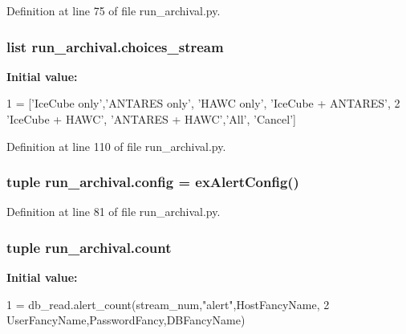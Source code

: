Definition at line 75 of file run\-\_\-archival.\-py.

\hypertarget{namespacerun__archival_a18e24cc5c90db59c1cff4c0f69f82fa6}{
\subsubsection[{choices\-\_\-stream}]{\setlength{\rightskip}{0pt plus 5cm}list run\-\_\-archival.\-choices\-\_\-stream}}\label{namespacerun__archival_a18e24cc5c90db59c1cff4c0f69f82fa6}
{\bfseries Initial value\-:}
\begin{DoxyCode}
1 = [\textcolor{stringliteral}{'IceCube only'},\textcolor{stringliteral}{'ANTARES only'}, \textcolor{stringliteral}{'HAWC only'}, \textcolor{stringliteral}{'IceCube + ANTARES'},
2                     \textcolor{stringliteral}{'IceCube + HAWC'}, \textcolor{stringliteral}{'ANTARES + HAWC'},\textcolor{stringliteral}{'All'}, \textcolor{stringliteral}{'Cancel'}]
\end{DoxyCode}


Definition at line 110 of file run\-\_\-archival.\-py.

\hypertarget{namespacerun__archival_abe42e5e247442fb2afd7c8aa5322cd5f}{
\subsubsection[{config}]{\setlength{\rightskip}{0pt plus 5cm}tuple run\-\_\-archival.\-config = ex\-Alert\-Config()}}\label{namespacerun__archival_abe42e5e247442fb2afd7c8aa5322cd5f}


Definition at line 81 of file run\-\_\-archival.\-py.

\hypertarget{namespacerun__archival_ab4dad5a97c86185353fedf0feefa562e}{
\subsubsection[{count}]{\setlength{\rightskip}{0pt plus 5cm}tuple run\-\_\-archival.\-count}}\label{namespacerun__archival_ab4dad5a97c86185353fedf0feefa562e}
{\bfseries Initial value\-:}
\begin{DoxyCode}
1 = db\_read.alert\_count(stream\_num,\textcolor{stringliteral}{"alert"},HostFancyName,
2                            UserFancyName,PasswordFancy,DBFancyName)
\end{DoxyCode}


